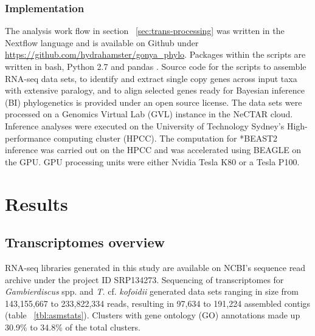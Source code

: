\documentclass[12pt]{article}
\begin{document}
\subsubsection{Implementation}
\label{sec:implement}
The analysis work flow in section ~\ref{sec:trans-processing} was written in the Nextflow language \cite{nextflow} and is available on Github under \url{https://github.com/hydrahamster/gonya_phylo}. 
Packages within the scripts are written in bash, Python 2.7 \cite{python} and pandas \cite{pandas}. 
Source code for the scripts to assemble RNA-seq data sets, to identify and extract single copy genes across input taxa with extensive paralogy, and to align selected genes ready for Bayesian inference (BI) phylogenetics is provided under an open source license.
The data sets were processed on a Genomics Virtual Lab (GVL) \cite{afgan2015genomics} instance in the NeCTAR cloud.
Inference analyses were executed on the University of Technology Sydney's High-performance computing cluster (HPCC).  
The computation for *BEAST2 inference was carried out on the HPCC and was accelerated using BEAGLE \cite{ayres2011beagle} on the GPU.
GPU processing units were either Nvidia Tesla K80 or a Tesla P100.

\newpage
\section{Results}
\subsection{Transcriptomes overview}
RNA-seq libraries generated in this study are available on NCBI's sequence read archive under the project ID SRP134273.
Sequencing of transcriptomes for \emph{Gambierdiscus} spp. and \emph{T.} cf. \emph{kofoidii} generated data sets ranging in size from 143,155,667 to 233,822,334 reads, resulting in 97,634 to 191,224 assembled contigs (table ~\ref{tbl:asmstats}). 
Clusters with gene ontology (GO) annotations made up 30.9\% to 34.8\% of the total clusters. 
\end{document}
